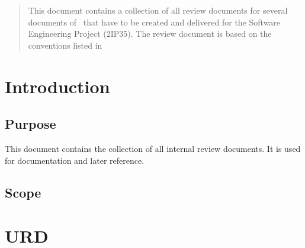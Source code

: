 
\renewcommand{\pathtobase}[1]{../#1}

\renewcommand{\TitelFull}{Review document}



\fingerpainttitlepage{}

\begin{abstract}
This document contains a collection of all review documents for several documents of \projectname\ that have to be created and delivered for the Software Engineering Project (2IP35). The review document is based on the conventions listed in 
\end{abstract}

\tableofcontents

\chapter{Introduction}
\section{Purpose}
This document contains the collection of all internal review documents. It is used for documentation and later reference.

\section{Scope}

\chapter{URD}


